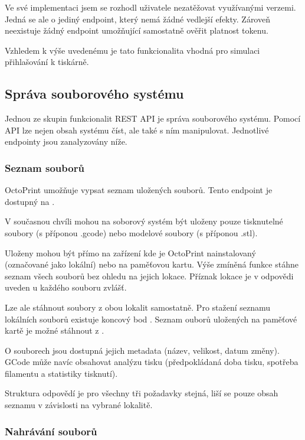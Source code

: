 Ve své implementaci jsem se rozhodl uživatele nezatěžovat využívanými verzemi.
Jedná se ale o jediný endpoint, který nemá žádné vedlejší efekty.
Zároveň neexistuje žádný endpoint umožňující samostatně ověřit platnost tokenu.

Vzhledem k výše uvedenému je tato funkcionalita vhodná pro simulaci přihlašování k tiskárně.

\subsection{Správa souborového systému}

Jednou ze skupin funkcionalit REST API je správa souborového systému.
Pomocí API lze nejen obsah systému číst, ale také s ním manipulovat.
Jednotlivé endpointy jsou zanalyzovány níže.

\subsubsection*{Seznam souborů}

OctoPrint umožňuje vypsat seznam uložených souborů.
Tento endpoint je dostupný na .

V současnou chvíli mohou na soborový systém být uloženy pouze tisknutelné soubory (s příponou .gcode) nebo modelové soubory (s příponou .stl).

Uloženy mohou být přímo na zařízení kde je OctoPrint nainstalovaný (označované jako lokální) nebo na paměťovou kartu.
Výše zmíněná funkce stáhne seznam všech souborů bez ohledu na jejich lokace.
Příznak lokace je v odpovědi uveden u každého souboru zvlášť.

Lze ale stáhnout soubory z obou lokalit samostatně.
Pro stažení seznamu lokálních souborů existuje koncový bod .
Seznam ouborů uložených na paměťové kartě je možné stáhnout z .

O souborech jsou dostupná jejich metadata (název, velikost, datum změny).
GCode může navíc obsahovat analýzu tisku (předpokládaná doba tisku, spotřeba filamentu a statistiky tisknutí).

Struktura odpovědí je pro všechny tři požadavky stejná, liší se pouze obsah seznamu v závislosti na vybrané lokalitě.

\subsubsection*{Nahrávání souborů}

